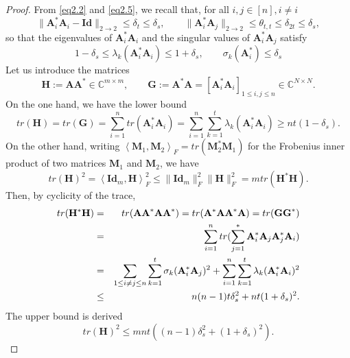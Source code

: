 \begin{proof}
    From \cref{eq2.2} and \cref{eq2.5}, we recall that, for all $i,j \in [n], i \neq i$
    \[
        \|\mathbf{A}_i^*\mathbf{A}_i - \mathbf{Id}\|_{2 \rightarrow 2} \leq \delta_t \leq \delta_s, \qquad \|\mathbf{A}_i^*\mathbf{A}_j\|_{2 \rightarrow 2} \leq \theta_{t,t} \leq \delta_{2t} \leq \delta_s,
    \]
    so that the eigenvalues of $\mathbf{A}_i^*\mathbf{A}_i$ and the singular values of $\mathbf{A}_i^*\mathbf{A}_j$ satisfy
    \[
        1 - \delta_s \leq \lambda_k(\mathbf{A}_i^*\mathbf{A}_i) \leq 1 + \delta_s, \qquad \sigma_k(\mathbf{A}_i^*) \leq \delta_s
    \]
    Let us introduce the matrices 
    \[
        \mathbf{H} := \mathbf{AA}^* \in \mathbb{C}^{m \times m}, \qquad \mathbf{G} := \mathbf{A}^*\mathbf{A} = [\mathbf{A}_i^* \mathbf{A}_i]_{1 \leq i, j\leq n} \in \mathbb{C}^{N \times N}.
    \]
    On the one hand, we have the lower bound
    \begin{equation}
        tr(\mathbf{H}) = tr(\mathbf{G}) = \sum\limits_{i = 1}^n tr(\mathbf{A}_i^* \mathbf{A}_i) = \sum\limits_{i=1}^n \sum\limits_{k=1}^t \lambda_k(\mathbf{A}_i^*\mathbf{A}_i) \geq nt (1- \delta_s).
        \label{eq2.10}
    \end{equation}
    On the other hand, writing $\left<\mathbf{M}_1,\mathbf{M}_2\right>_F = tr(\mathbf{M}_2^* \mathbf{M}_1)$ for the Frobenius inner product of two matrices $\mathbf{M}_1$ and $\mathbf{M}_2$, we have
    \[
        tr(\mathbf{H})^2 = \left<\mathbf{Id}_m, \mathbf{H}\right>_F^2 \leq \|\mathbf{Id}_m\|_F^2 \|\mathbf{H}\|_F^2 = m tr(\mathbf{H}^*\mathbf{H}).
    \]
    Then, by cyclicity of the trace,
    \begin{eqnarray}
        tr(\mathbf{H}^*\mathbf{H}) &=& tr(\mathbf{AA}^*\mathbf{AA}^*) = tr(\mathbf{A}^*\mathbf{AA}^*\mathbf{A}) = tr(\mathbf{GG}^*) \notag \\
        &=& \sum\limits_{i=1}^n tr(\sum\limits_{j=1}^* \mathbf{A}_i^* \mathbf{A}_j \mathbf{A}_j^* \mathbf{A}_i) \notag \\
    &=& \sum\limits_{1 \leq i \neq j \leq n} \sum\limits_{k=1}^t \sigma_k(\mathbf{A}_i^* \mathbf{A}_j)^2 + \sum\limits_{i=1}^n \sum\limits_{k=1} ^t \lambda_k (\mathbf{A}_i^* \mathbf{A}_i)^2 \notag \\
        &\leq& n (n-1) t \delta_s^2 + nt(1+\delta_s)^2. \notag 
    \end{eqnarray}
    The upper bound is derived
    \begin{equation}
        tr(\mathbf{H})^2 \leq m n t \left( (n-1)\delta_s^2 + (1+ \delta_s)^2 \right).
        \label{eq2.11}
    \end{equation}

\end{proof}
